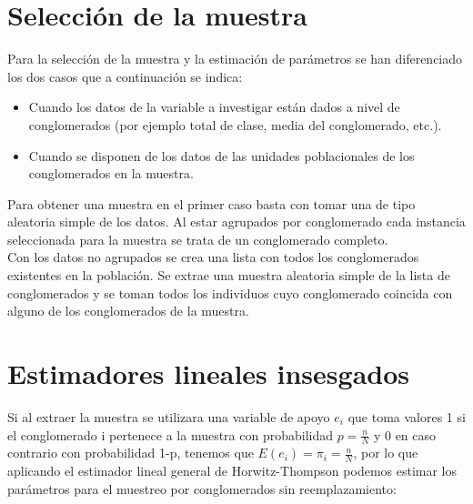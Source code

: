\section{Selección de la muestra} \label{sect:6.1}
Para la selección de la muestra y la estimación de parámetros se han diferenciado los dos casos que a continuación se indica:

\begin{itemize}[label=$\bullet$]
    \item Cuando los datos de la variable a investigar están dados a nivel de conglomerados (por ejemplo total de clase, media del conglomerado, etc.).
    \item Cuando se disponen de los datos de las unidades poblacionales de los conglomerados en la muestra.
\end{itemize}






Para obtener una muestra en el primer caso basta con tomar una de tipo aleatoria simple de los datos. Al estar agrupados por conglomerado cada instancia seleccionada para la muestra se trata de un conglomerado completo.\\

Con los datos no agrupados se crea una lista con todos los conglomerados existentes en la población. Se extrae una muestra aleatoria simple de la lista de conglomerados y se toman todos los individuos cuyo conglomerado coincida con alguno de los conglomerados de la muestra.

\section{Estimadores lineales insesgados} \label{sect:6.2}
Si al extraer la muestra se utilizara una variable de apoyo $e_i$ que toma valores 1 si el conglomerado i pertenece a la muestra con probabilidad $p=\frac{n}{N}$ y 0 en caso contrario con probabilidad 1-p, tenemos que $E(e_i) = \pi_i = \frac{n}{N}$, por lo que aplicando el estimador lineal general de Horwitz-Thompson podemos estimar los parámetros para el muestreo por conglomerados sin reemplazamiento:

